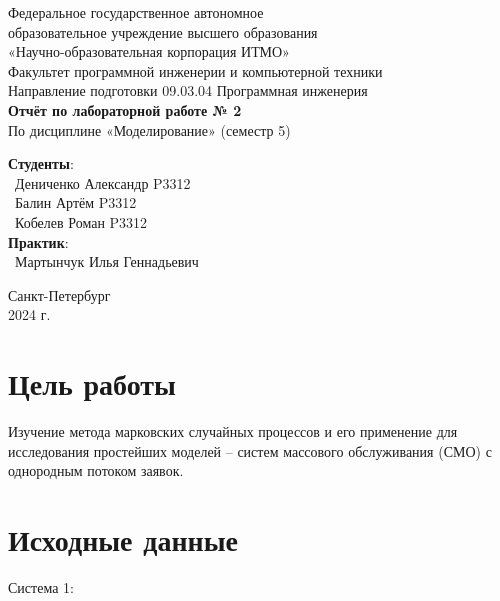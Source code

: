 \documentclass{article}
\begin{document}
\begin{center}
    \Large
    Федеральное государственное автономное \\
    образовательное учреждение высшего образования \\ 
    «Научно-образовательная корпорация ИТМО»\\
    \vspace{0.5cm}
    \large
    Факультет программной инженерии и компьютерной техники \\
    Направление подготовки 09.03.04 Программная инженерия \\
    \vspace{1cm}
    \Large
    \textbf{Отчёт по лабораторной работе № 2} \\
    По дисциплине «Моделирование» (семестр 5)\\
    \large
    \vspace{8cm}

    \begin{minipage}{.33\textwidth}
    \end{minipage}
    \hfill
    \begin{minipage}{.4\textwidth}
    
        \textbf{Студенты}: \vspace{.1cm} \\
        \ Дениченко Александр P3312\\
        \ Балин Артём P3312\\
        \ Кобелев Роман P3312\\
        \textbf{Практик}:  \\
        \ Мартынчук Илья Геннадьевич
    \end{minipage}
    \vfill
Санкт-Петербург\\ 2024 г.
\end{center}
\pagestyle{empty}
\newpage
\pagestyle{plain}

\section*{Цель работы}
Изучение метода марковских случайных процессов и его применение для
исследования простейших моделей – систем массового обслуживания (СМО) с
однородным потоком заявок.

\section{Исходные данные}
Система 1: 
\end{document}
